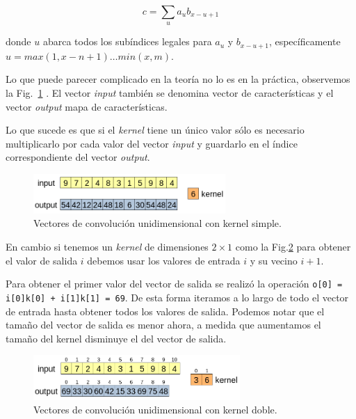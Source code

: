 \documentclass[a4paper,12pt]{article}
\begin{document}
$$ c = \sum_{u} a_u b_{x-u+1}$$

donde $u$ abarca todos los subíndices legales para $a_u$ y $b_{x-u+1}$, específicamente $u=max(1, x-n+1)\dots min(x,m).$

Lo que puede parecer complicado en la teoría no lo es en la práctica, observemos la Fig.~\ref{fig:conv1dk1} \citep{Cogneethi2019Aug}. El vector \textit{input} también se denomina vector de características y el vector \textit{output} mapa de características.

Lo que sucede es que si el \textit{kernel} tiene un único valor sólo es necesario multiplicarlo por cada valor del vector \textit{input} y guardarlo en el índice correspondiente del vector \textit{output}.

\begin{figure}[H]
	\begin{center}				
	\includegraphics[width=0.65\textwidth]{tesis_24.png}
  	\caption{Vectores de convolución unidimensional con kernel simple.}
  	\label{fig:conv1dk1}
  	\end{center}
\end{figure}

En cambio si tenemos un \textit{kernel} de dimensiones $2 \times 1$ como la Fig.\ref{fig:conv1dk2} para obtener el valor de salida $i$ debemos usar los valores de entrada $i$ y su vecino $i+1$.

Para obtener el primer valor del vector de salida se realizó la operación \texttt{o[0] = i[0]k[0] + i[1]k[1] = 69}. De esta forma iteramos a lo largo de todo el vector de entrada hasta obtener todos los valores de salida. Podemos notar que el tamaño del vector de salida es menor ahora, a medida que aumentamos el tamaño del kernel disminuye el del vector de salida.

\begin{figure}[H]
	\begin{center}				
	\includegraphics[width=0.7\textwidth]{tesis_25.png}
  	\caption{Vectores de convolución unidimensional con kernel doble.}
  	\label{fig:conv1dk2}
  	\end{center}
\end{figure}
\end{document}
